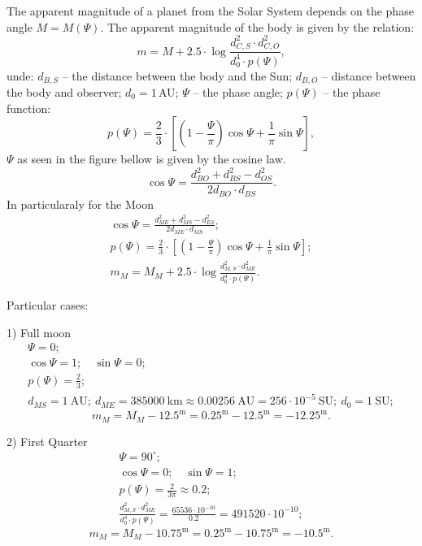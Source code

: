 The apparent magnitude of a planet from the Solar System depends on the phase
angle $M = M(\Psi)$. The apparent magnitude of the body is given by the
relation:
\[
m = M + 2.5\cdot\log\frac{d_{C,S}^{2}\cdot d_{C,O}^{2}}{d_{0}^{4}\cdot p(\Psi)},
\]
unde: $d_{B,S}$ -- the distance between the body and the Sun; $d_{B,O}$ --
distance between the body and observer; $d_{0} = 1$\,AU; $\Psi$ -- the phase
angle; $p(\Psi)$ -- the phase function:
\[
p(\Psi) = \frac{2}{3}\cdot\left[\left(1 - \frac{\Psi}{\pi}\right)\cos\Psi
  + \frac{1}{\pi}\sin\Psi\right],
\]
$\Psi$ as seen in the figure bellow is given by the cosine law.
\[
\cos\Psi = \frac{d_{BO}^{2} + d_{BS}^{2} - d_{OS}^{2}}{2 d_{BO}\cdot d_{BS}}.
\]
In particularaly for the Moon
\begin{gather*}
\cos\Psi = \frac{d_{ME}^{2} + d_{MS}^{2} - d_{ES}^{2}}{2 d_{ME}\cdot d_{MS}};\\
p(\Psi) = \frac{2}{3}\cdot\left[\left(1 - \frac{\Psi}{\pi}\right)\cos\Psi
  + \frac{1}{\pi}\sin\Psi\right];\\
m_{M} = M_{M} + 2.5\cdot\log\frac{d_{M,S}^{2}\cdot d_{ME}^{2}}
  {d_{0}^{4}\cdot p(\Psi)}.
\end{gather*}

Particular cases:

1) Full moon
\begin{gather*}
\Psi = 0;\\
\cos\Psi = 1;\quad \sin\Psi = 0;\\
p(\Psi) = \frac{2}{3};\\
d_{MS} = 1~\mathrm{AU};\ d_{ME} = 385000~\mathrm{km} \approx 0.00256~\mathrm{AU}
  = 256\cdot10^{-5}~\mathrm{SU};\ d_{0} = 1~\mathrm{SU};
\end{gather*}
\[
m_{M} = M_{M} - 12.5^{\mathrm{m}} = 0.25^{\mathrm{m}} - 12.5^{\mathrm{m}}
      = -12.25^{\mathrm{m}}.
\]

2) First Quarter
\begin{gather*}
\Psi = 90^\circ;\\
\cos\Psi = 0;\quad \sin\Psi = 1;\\
p(\Psi) = \frac{2}{3\pi} \approx 0.2;\\
\frac{d_{M,S}^{2}\cdot d_{ME}^{2}}{d_{0}^{4}\cdot p(\Psi)}
  = \frac{65536\cdot10^{-10}}{0.2} = 491520\cdot10^{-10};
\end{gather*}
\[
m_{M} = M_{M} - 10.75^{\mathrm{m}} = 0.25^{\mathrm{m}} - 10.75^{\mathrm{m}}
      = -10.5^{\mathrm{m}}.
\]
